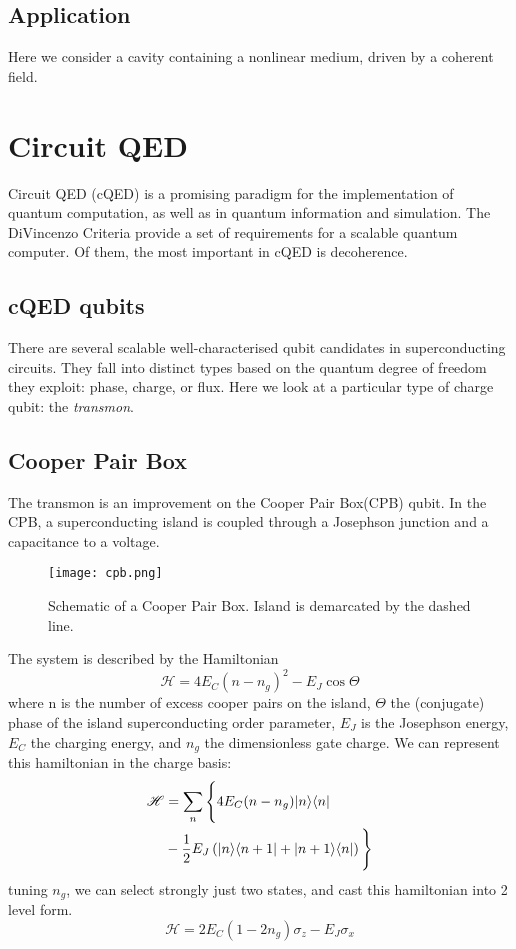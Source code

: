 \subsection{Application}
Here we consider a cavity containing a nonlinear medium, driven by a coherent field.
\section{Circuit QED}
Circuit QED (cQED) is a promising paradigm for the implementation of quantum computation, as well as in quantum information and simulation.
The DiVincenzo Criteria \cite{DiVincenzo} provide a set of requirements for a scalable quantum computer. 
Of them, the most important in cQED is decoherence. 
\subsection{cQED qubits}
There are several scalable well-characterised qubit candidates in superconducting circuits\cite{Makhlin2001}.
They fall into distinct types based on the quantum degree of freedom they exploit: phase, charge, or flux.
Here we look at a particular type of charge qubit: the \emph{transmon}.
\subsection{Cooper Pair Box}
The transmon is an improvement on the Cooper Pair Box(CPB) qubit.
In the CPB, a superconducting island is coupled through a Josephson junction and a capacitance to a voltage.
\begin{figure}[t]
  \texttt{[image: cpb.png]}
  \caption{Schematic of a Cooper Pair Box. Island is demarcated by the dashed line.}
\end{figure}
The system is described by the Hamiltonian\cite{Makhlin2001}
\begin{equation}
  \mathscr{H} = 4E_C(n-n_g)^2 - E_J \cos \Theta
\end{equation}
where n is the number of excess cooper pairs on the island, $\Theta$ the (conjugate) phase of the island superconducting order parameter, $E_J$ is the Josephson energy, $E_C$ the charging energy, and $n_g$ the dimensionless gate charge.
We can represent this hamiltonian in the charge basis:
\begin{align}
  \mathscr{H} &= \sum_n \Bigg\{ 4 E_C (n-n_g) | n \rangle \langle n |\\ 
              &- \frac{1}{2} E_J \left( | n \rangle \langle n+1 | 
                                       + | n+1 \rangle \langle n | \right) \Bigg\}
\end{align}
tuning $n_g$, we can select strongly just two states, and cast this hamiltonian into 2 level form.
\begin{equation}
  \mathscr{H} = 2E_C ( 1-2n_g ) \sigma_z - E_J \sigma_x 
\end{equation}
